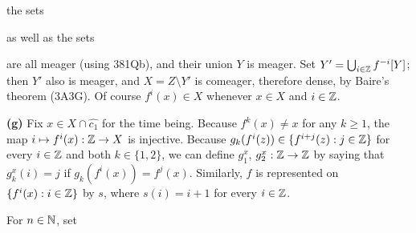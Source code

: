 {

\noindent the sets


\noindent as well as the sets


\noindent are all meager (using 381Qb), and their union $Y$ is meager.
Set $Y'=\bigcup_{i\in\Bbb Z}f^{-i}[Y]$;  then $Y'$ also is meager, and
$X=Z\setminus Y'$ is comeager, therefore dense, by Baire's theorem
(3A3G).   Of course $f^i(x)\in X$ whenever $x\in X$ and $i\in\Bbb Z$.

\medskip

{\bf (g)} Fix $x\in X\cap\widehat{c_1}$ for the time being.
Because $f^k(x)\ne x$ for any $k\ge 1$, the map
$i\mapsto f^i(x):\Bbb Z\to X$ is injective.   Because
$g_k(f^i(z))\in\{f^{i+j}(z):j\in\Bbb Z\}$ for every $i\in\Bbb Z$ and
both $k\in\{1,2\}$, we can define $g_1^x$, $g_2^x:\Bbb Z\to\Bbb Z$ by
saying that $g_k^x(i)=j$ if $g_k(f^i(x))=f^j(x)$.   Similarly, $f$ is
represented on $\{f^i(x):i\in\Bbb Z\}$ by $s$, where $s(i)=i+1$ for
every $i\in\Bbb Z$.

\medskip

 For $n\in\Bbb N$, set

}
